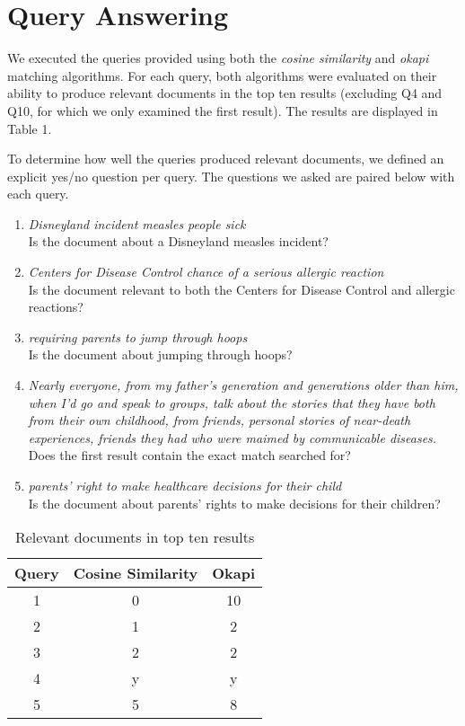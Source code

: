 \documentclass{report}
\newcommand{\query}[2]{\item\textit{#1}\\#2}
\begin{document}
\section{Query Answering}
We executed the queries provided using both the \textit{cosine
  similarity} and \textit{okapi} matching algorithms. For each query,
both algorithms were evaluated on their ability to produce relevant
documents in the top ten results (excluding Q4 and Q10, for which we only
examined the first result). The results are displayed in Table 1.

To determine how well the queries produced relevant documents, we
defined an explicit yes/no question per query. The questions we asked
are paired below with each query.

\begin{enumerate}[Q1:]
  \query{Disneyland incident measles people sick}{Is the document
about a Disneyland measles incident?}

  \query{Centers for Disease Control chance of a serious allergic
reaction}{Is the document relevant to both the Centers for Disease
Control and allergic reactions?}

  \query{requiring parents to jump through hoops}{Is the document
about jumping through hoops?}

  \query{Nearly everyone, from my father's generation and generations
older than him, when I'd go and speak to groups, talk about the
stories that they have both from their own childhood, from friends,
personal stories of near-death experiences, friends they had who were
maimed by communicable diseases.}{Does the first result contain the
exact match searched for?}

  \query{parents' right to make healthcare decisions for their
child}{Is the document about parents' rights to make decisions for
their children?}
\end{enumerate}

\begin{table}
  \begin{center}
    \begin{tabu}{c c c}
      \toprule
      Query & Cosine Similarity &  Okapi\\
       & 0 & 10\\
      2 & 1 & 2\\
      3 & 2 & 2\\
      4 & y & y\\
      5 & 5 & 8\\
      \bottomrule
    \end{tabu}
  \end{center}
  \caption{Relevant documents in top ten results}
  \label{tab:my_label}
\end{table}
\end{document}
